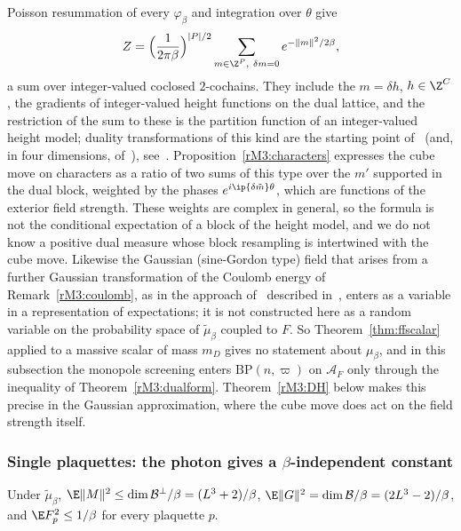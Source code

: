\begin{remark}
\label{rM3:nodual}
Poisson resummation of every $\varphi_\beta$ and integration over $\theta$
give
\[
Z=\Bigl(\frac1{2\pi\beta}\Bigr)^{\lvert P\rvert/2}\sum_{m\in\Z^P,\ \delta m
=0}e^{-\lVert m\rVert^2/2\beta},
\]
a sum over integer-valued coclosed $2$-cochains. They include the $m=
\delta h$, $h\in\Z^C$, the gradients of integer-valued height functions
on the dual lattice, and the restriction of the sum to these is the
partition function of an integer-valued height model; duality
transformations of this kind are the starting point of~\cite{GM82}
(and, in four dimensions, of~\cite{FS82}), see~\cite{RFN24}. Proposition~\ref{rM3:characters} expresses the cube
move on characters as a ratio of two sums of this type over the
$m'$ supported in the dual block, weighted by the phases
$e^{i\ip{\delta\tilde m}\theta}$, which are functions of the exterior field
strength. These weights are complex in general, so the formula is not
the conditional expectation of a block of the height model, and we do not
know a positive dual measure whose block resampling is intertwined with the
cube move. Likewise the Gaussian (sine-Gordon type) field that arises
from a further Gaussian transformation of the Coulomb energy of
Remark~\ref{rM3:coulomb}, as in the approach of~\cite{GM82} described
in~\cite{RFN24}, enters as a variable in a representation of
expectations; it is not constructed here as a random variable on the
probability space of $\tilde\mu_\beta$ coupled to $F$. So
Theorem~\ref{thm:ffscalar} applied to a massive scalar of mass $m_D$ gives
no statement about $\mu_\beta$, and in this subsection the monopole
screening enters $\mathrm{BP}(n,\varpi)$ on $\mathcal A_F$ only through
the inequality of Theorem~\ref{rM3:dualform}. Theorem~\ref{rM3:DH} below makes this
precise in the Gaussian approximation, where the cube move does act on
the field strength itself.
\end{remark}
\subsubsection{Single plaquettes: the photon gives a $\beta$-independent
constant}\label{rM3:plaqsec}

\begin{lemma}\label{rM3:moment}
Under $\tilde\mu_\beta$, $\E\lVert M\rVert^2\le\dim\mathcal B^\perp/\beta
=(L^3+2)/\beta$, $\E\lVert G\rVert^2=\dim\mathcal B/\beta=(2L^3-2)/\beta$,
and $\E F_p^2\le1/\beta$ for every plaquette $p$.
\end{lemma}

